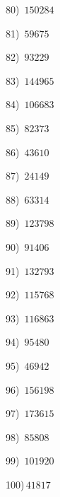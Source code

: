 \documentclass{article}
\begin{document}
\begin{multicols}{2}
80)$\,\,\,150284$ \par 
81)$\,\,\,59675$ \par 
82)$\,\,\,93229$ \par 
83)$\,\,\,144965$ \par 
84)$\,\,\,106683$ \par 
85)$\,\,\,82373$ \par 
86)$\,\,\,43610$ \par 
87)$\,\,\,24149$ \par 
88)$\,\,\,63314$ \par 
89)$\,\,\,123798$ \par 
90)$\,\,\,91406$ \par 
91)$\,\,\,132793$ \par 
92)$\,\,\,115768$ \par 
93)$\,\,\,116863$ \par 
94)$\,\,\,95480$ \par 
95)$\,\,\,46942$ \par 
96)$\,\,\,156198$ \par 
97)$\,\,\,173615$ \par 
98)$\,\,\,85808$ \par 
99)$\,\,\,101920$ \par 
100)$\,41817$ \par 
\end{multicols} 
\end{document}
